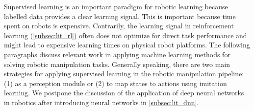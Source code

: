 \documentclass[\home/main.tex]{subfiles}
\begin{document}
Supervised learning is an important paradigm for robotic learning because labelled data provides a clear learning signal. This is important because time spent on robots is expensive. Contrarily, the learning signal in reinforcement learning (\cref{subsec:lit_rl}) often does not optimize for direct task performance and might lead to expensive learning times on physical robot platforms. The following paragraphs discuss relevant work in applying machine learning methods for solving robotic manipulation tasks. Generally speaking, there are two main strategies for applying supervised learning in the robotic manipulation pipeline: (1) as a perception module or (2) to map states to actions using imitation learning. We postpone the discussion of the application of deep neural networks in robotics after introducing neural networks in \cref{subsec:lit_dnn}.
\end{document}
